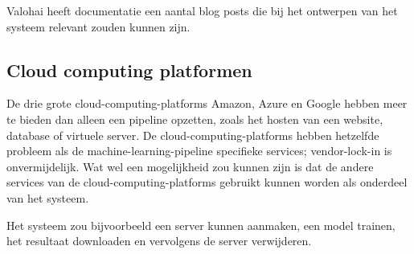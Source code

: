 Valohai heeft documentatie een aantal blog posts die bij het ontwerpen van het systeem relevant zouden kunnen zijn.

\subsection{Cloud computing platformen}\label{subsec:cloud-computing-platformen}
De drie grote \glspl{cloud-computing-platform} Amazon, Azure en Google hebben meer te bieden dan alleen een pipeline opzetten, zoals het hosten van een website, database of virtuele server. De \glspl{cloud-computing-platform} hebben hetzelfde probleem als de \gls{machine-learning-pipeline} specifieke services; \gls{vendor-lock-in} is onvermijdelijk. Wat wel een mogelijkheid zou kunnen zijn is dat de andere services van de \glspl{cloud-computing-platform} gebruikt kunnen worden als onderdeel van het systeem.

Het systeem zou bijvoorbeeld een server kunnen aanmaken, een model trainen, het resultaat downloaden en vervolgens de server verwijderen.



